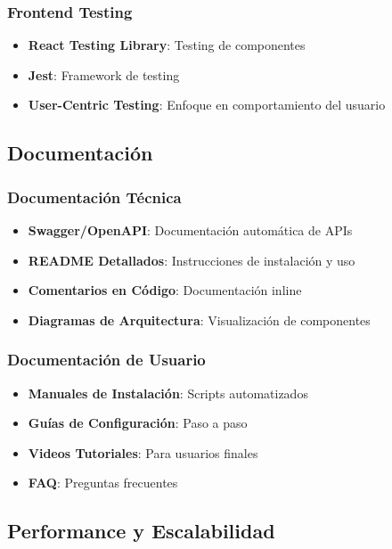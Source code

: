 \documentclass[12pt,a4paper]{article}
\begin{document}
\subsubsection{Frontend Testing}
\begin{itemize}
    \item \textbf{React Testing Library}: Testing de componentes
    \item \textbf{Jest}: Framework de testing
    \item \textbf{User-Centric Testing}: Enfoque en comportamiento del usuario
\end{itemize}

\subsection{Documentación}

\subsubsection{Documentación Técnica}
\begin{itemize}
    \item \textbf{Swagger/OpenAPI}: Documentación automática de APIs
    \item \textbf{README Detallados}: Instrucciones de instalación y uso
    \item \textbf{Comentarios en Código}: Documentación inline
    \item \textbf{Diagramas de Arquitectura}: Visualización de componentes
\end{itemize}

\subsubsection{Documentación de Usuario}
\begin{itemize}
    \item \textbf{Manuales de Instalación}: Scripts automatizados
    \item \textbf{Guías de Configuración}: Paso a paso
    \item \textbf{Videos Tutoriales}: Para usuarios finales
    \item \textbf{FAQ}: Preguntas frecuentes
\end{itemize}

\subsection{Performance y Escalabilidad}
\end{document}
